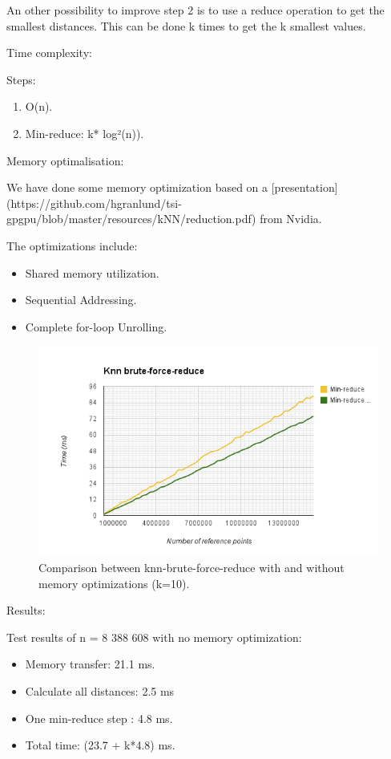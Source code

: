 \begin{enumerate}
\begin{enumerate}
An other possibility to improve step 2 is to use a reduce operation to get the smallest distances. This can be done k times to get the k smallest values.

Time complexity:

Steps:

\begin{enumerate}
    \item O(n).
    \item Min-reduce: k* log²(n)).
\end{enumerate}

Memory optimalisation:

We have done some memory optimization based on a [presentation](https://github.com/hgranlund/tsi-gpgpu/blob/master/resources/kNN/reduction.pdf) from Nvidia.

The optimizations include:

\begin{itemize}
    \item Shared memory utilization.
    \item Sequential Addressing.
    \item Complete for-loop Unrolling.
\end{itemize}

\begin{figure}[ht!]
\centering
\includegraphics[width=120mm]{gfx/knn-brute-force-reduce-memory-opt.png}

\caption{Comparison between knn-brute-force-reduce with and without memory optimizations (k=10).}
\label{fig:knn_brute_force_reduce_memory_opt}
\end{figure}

Results:

Test results of n = 8 388 608 with no memory optimization:
\begin{itemize}
    \item Memory transfer:  21.1 ms.
    \item Calculate all distances: 2.5 ms
    \item One min-reduce step : 4.8 ms.
    \item Total time: (23.7 + k*4.8) ms.
\end{itemize}


\end{enumerate}
\end{enumerate}
